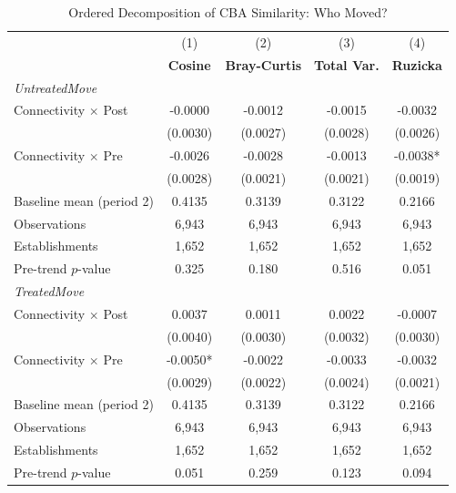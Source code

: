 \begin{table}[H]
\centering
\caption{Ordered Decomposition of CBA Similarity: Who Moved?}
\scriptsize
\setlength{\tabcolsep}{8pt}
\begin{tabular}{lcccc}
\hline\hline
 & (1) & (2) & (3) & (4) \\
 & \textbf{Cosine} & \textbf{Bray-Curtis} & \textbf{Total Var.} & \textbf{Ruzicka} \\
\hline
\multicolumn{5}{l}{\textit{UntreatedMove}} \\
\quad Connectivity $\times$ Post & -0.0000 & -0.0012 & -0.0015 & -0.0032 \\
\quad & (0.0030) & (0.0027) & (0.0028) & (0.0026) \\
\quad Connectivity $\times$ Pre  & -0.0026 & -0.0028 & -0.0013 & -0.0038* \\
\quad & (0.0028) & (0.0021) & (0.0021) & (0.0019) \\
\hline
Baseline mean (period 2) & 0.4135 & 0.3139 & 0.3122 & 0.2166 \\
Observations           & 6,943 & 6,943 & 6,943 & 6,943 \\
Establishments         & 1,652 & 1,652 & 1,652 & 1,652 \\
Pre-trend $p$-value    & 0.325 & 0.180 & 0.516 & 0.051 \\
\hline
\multicolumn{5}{l}{\textit{TreatedMove}} \\
\quad Connectivity $\times$ Post & 0.0037 & 0.0011 & 0.0022 & -0.0007 \\
\quad & (0.0040) & (0.0030) & (0.0032) & (0.0030) \\
\quad Connectivity $\times$ Pre  & -0.0050* & -0.0022 & -0.0033 & -0.0032 \\
\quad & (0.0029) & (0.0022) & (0.0024) & (0.0021) \\
\hline
Baseline mean (period 2) & 0.4135 & 0.3139 & 0.3122 & 0.2166 \\
Observations           & 6,943 & 6,943 & 6,943 & 6,943 \\
Establishments         & 1,652 & 1,652 & 1,652 & 1,652 \\
Pre-trend $p$-value    & 0.051 & 0.259 & 0.123 & 0.094 \\
\hline\hline
\end{tabular}
\begin{minipage}{\linewidth}
\smallskip

\end{minipage}
\end{table}
